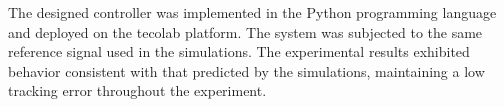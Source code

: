 The designed controller was implemented in the Python programming language and
deployed on the \gls{tecolab} platform. The system was subjected to the same
reference signal used in the simulations. The experimental results exhibited
behavior consistent with that predicted by the simulations, maintaining a low
tracking error throughout the experiment.
